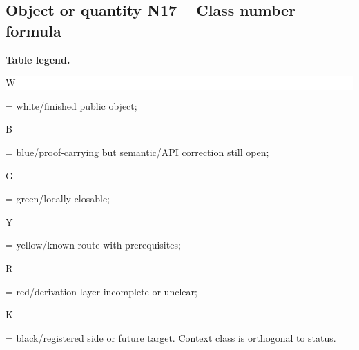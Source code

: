 \subsection*{Object or quantity N17 -- Class number formula}
\hypertarget{objproof:N17}{}
\par\smallskip\noindent\begin{minipage}{0.99\linewidth}\footnotesize\raggedright\textbf{Table legend.} \colorbox{white}{\strut W} = white/finished public object; \colorbox{cyan!20}{\strut B} = blue/proof-carrying but semantic/API correction still open; \colorbox{green!18}{\strut G} = green/locally closable; \colorbox{yellow!25}{\strut Y} = yellow/known route with prerequisites; \colorbox{red!20}{\strut R} = red/derivation layer incomplete or unclear; \colorbox{black!18}{\strut K} = black/registered side or future target. Context class is orthogonal to status.\end{minipage}\par\vspace{0.25em}
